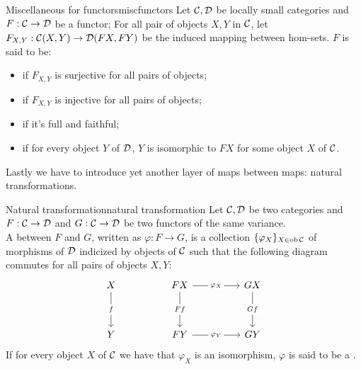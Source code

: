 \documentclass{article}
\begin{document}
\begin{definition}{Miscellaneous for functors}{miscfunctors}
    Let $\mathcal{C},\mathcal{D}$ be locally small categories and $F:\mathcal{C}\to \mathcal{D}$ be a functor; For all pair of objects $X,Y$ in $\mathcal{C}$, let $F_{X,Y} : \mathcal{C}(X,Y)\to \mathcal{D}(FX,FY)$  be the induced mapping between hom-sets. $F$ is said to be:\begin{itemize}
        \item {} if $F_{X,Y}$ is surjective for all pairs of objects;
        \item {} if $F_{X,Y}$ is injective for all pairs of objects;
        \item {} if it's full and faithful;
        \item {} if for every object $Y$ of $\mathcal{D}$, $Y$ is isomorphic to $FX$ for some object $X$ of $\mathcal{C}$.
    \end{itemize}
\end{definition}

Lastly we have to introduce yet another layer of maps between maps: natural transformations.

\begin{definition}{Natural transformation}{natural transformation}
    Let $\mathcal{C},\mathcal{D}$ be two categories and $F : \mathcal{C}\to\mathcal{D}$ and $G:\mathcal{C}\to\mathcal{D}$ be two functors of the same variance.\\
    A  between $F$ and $G$, written as $\varphi : F \to G$, is a collection $\{\varphi_X\}_{X \in \operatorname{ob}\mathcal{C}}$ of morphisms of $\mathcal{D}$ indicized by objects of $\mathcal{C}$ such that the following diagram commutes for all pairs of objects $X,Y$:
    \[\begin{tikzcd}
    	X && FX && GX \\
    	\\
    	Y && FY && GY
    	\arrow["f"{description}, from=1-1, to=3-1]
    	\arrow["{\varphi_X}"{description}, from=1-3, to=1-5]
    	\arrow["Ff"{description}, from=1-3, to=3-3]
    	\arrow["Gf"{description}, from=1-5, to=3-5]
    	\arrow["{\varphi_Y}"{description}, from=3-3, to=3-5]
    \end{tikzcd}\]
    If for every object $X$ of $\mathcal{C}$ we have that $\varphi_X$ is an isomorphism, $\varphi$ is said to be a .
\end{definition}
\end{document}
